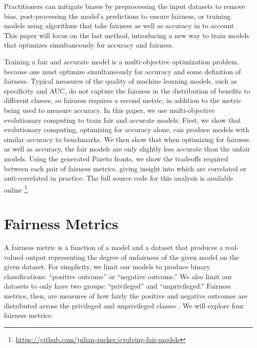\documentclass{elsarticle}
\begin{document}
Practitioners can mitigate biases by preprocessing the input datasets to remove bias, post-processing the model’s predictions to ensure fairness, or training models using algorithms that take fairness as well as accuracy in to account \citep{Angwin:2016}. This paper will focus on the last method, introducing a new way to train models that optimizes simultaneously for accuracy and fairness. 

Training a fair and accurate model is a multi-objective optimization problem, because one must optimize simultaneously for accuracy and some definition of fairness. Typical measures of the quality of machine learning models, such as specificity and AUC, do not capture the fairness in the distribution of benefits to different classes, so fairness requires a second metric, in addition to the metric being used to measure accuracy. In this paper, we use multi-objective evolutionary computing to train fair and accurate models. First, we show that evolutionary computing, optimizing for accuracy alone, can produce models with similar accuracy to benchmarks. We then show that when optimizing for fairness as well as accuracy, the fair models are only slightly less accurate than the unfair models. Using the generated Pareto fronts, we show the tradeoffs required between each pair of fairness metrics, giving insight into which are correlated or anti-correlated in practice. The full source code for this analysis is available online \footnote{ \href{https://github.com/julian-zucker/evolving-fair-models}{https://github.com/julian-zucker/evolving-fair-models}}.

\section{Fairness Metrics}
A fairness metric is a function of a model and a dataset that produces a real-valued output representing the degree of unfairness of the given model on the given dataset. For simplicity, we limit our models to produce binary classifications: “positive outcome” or “negative outcome.” We also limit our datasets to only have two groups: “privileged” and “unprivileged.” Fairness metrics, then, are measures of how fairly the positive and negative outcomes are distributed across the privileged and unprivileged classes \citep{Binns:2017}. We will explore four fairness metrics:
\end{document}
